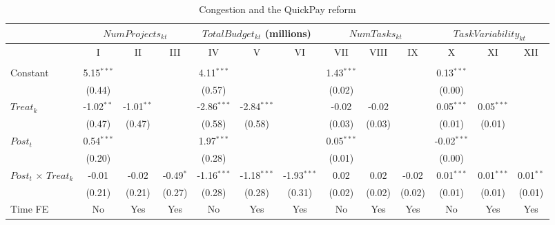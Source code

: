 \documentclass[
]{article}
\begin{document}
\begin{table}[htbp]
   \caption{Congestion and the QuickPay reform}
   \centering
   \tiny
   \begin{tabular}{lcccccccccccc}
      \toprule
      \midrule  & \multicolumn{3}{c}{$NumProjects_{kt}$} & \multicolumn{3}{c}{$TotalBudget_{kt}$ (millions)} & \multicolumn{3}{c}{$NumTasks_{kt}$} & \multicolumn{3}{c}{$TaskVariability_{kt}$}\\
      \midrule  & I & II & III & IV & V & VI & VII & VIII & IX & X & XI & XII\\
      \midrule \\
      Constant                     & 5.15$^{***}$ &              &             & 4.11$^{***}$  &               &               & 1.43$^{***}$ &        &        & 0.13$^{***}$  &              &   \\   
                                   & (0.44)       &              &             & (0.57)        &               &               & (0.02)       &        &        & (0.00)        &              &   \\   
      $Treat_k$                    & -1.02$^{**}$ & -1.01$^{**}$ &             & -2.86$^{***}$ & -2.84$^{***}$ &               & -0.02        & -0.02  &        & 0.05$^{***}$  & 0.05$^{***}$ &   \\   
                                   & (0.47)       & (0.47)       &             & (0.58)        & (0.58)        &               & (0.03)       & (0.03) &        & (0.01)        & (0.01)       &   \\   
      $Post_t$                     & 0.54$^{***}$ &              &             & 1.97$^{***}$  &               &               & 0.05$^{***}$ &        &        & -0.02$^{***}$ &              &   \\   
                                   & (0.20)       &              &             & (0.28)        &               &               & (0.01)       &        &        & (0.00)        &              &   \\   
      $Post_t$ $\times$ $Treat_k$  & -0.01        & -0.02        & -0.49$^{*}$ & -1.16$^{***}$ & -1.18$^{***}$ & -1.93$^{***}$ & 0.02         & 0.02   & -0.02  & 0.01$^{***}$  & 0.01$^{***}$ & 0.01$^{**}$\\   
                                   & (0.21)       & (0.21)       & (0.27)      & (0.28)        & (0.28)        & (0.31)        & (0.02)       & (0.02) & (0.02) & (0.01)        & (0.01)       & (0.01)\\   
      \midrule 
      Time FE                      & No           & Yes          & Yes         & No            & Yes           & Yes           & No           & Yes    & Yes    & No            & Yes          & Yes\\  

\end{tabular}
\end{table}
\end{document}
